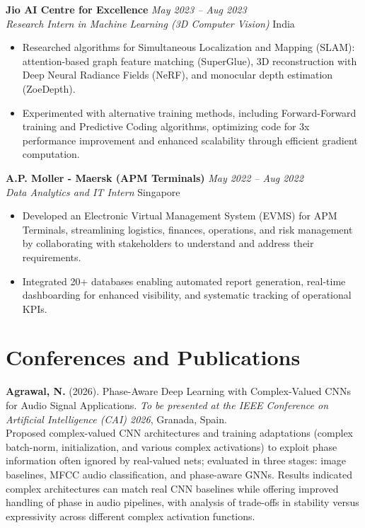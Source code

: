 \documentclass[10pt,a4paper]{article}
\newcommand{\cventry}[4]{%
\textbf{#1} \hfill \textit{#2} \\
\textit{#3} \hfill #4
\vspace{2pt}
}
\begin{document}
\vspace{4pt}

\cventry{Jio AI Centre for Excellence}{May 2023 -- Aug 2023}{Research Intern in Machine Learning (3D Computer Vision)}{India}
\begin{itemize}
    \item Researched algorithms for Simultaneous Localization and Mapping (SLAM): attention-based graph feature matching (SuperGlue), 3D reconstruction with Deep Neural Radiance Fields (NeRF), and monocular depth estimation (ZoeDepth).
    \item Experimented with alternative training methods, including Forward-Forward training and Predictive Coding algorithms, optimizing code for 3x performance improvement and enhanced scalability through efficient gradient computation.
\end{itemize}

\vspace{4pt}

\cventry{A.P. Moller - Maersk (APM Terminals)}{May 2022 -- Aug 2022}{Data Analytics and IT Intern}{Singapore}
\begin{itemize}
    \item Developed an Electronic Virtual Management System (EVMS) for APM Terminals, streamlining logistics, finances, operations, and risk management by collaborating with stakeholders to understand and address their requirements.
    \item Integrated 20+ databases enabling automated report generation, real-time dashboarding for enhanced visibility, and systematic tracking of operational KPIs.
\end{itemize}

\section{Conferences and Publications}

\textbf{Agrawal, N.} (2026). Phase-Aware Deep Learning with Complex-Valued CNNs for Audio Signal Applications. \textit{To be presented at the IEEE Conference on Artificial Intelligence (CAI) 2026}, Granada, Spain.\\
{\small Proposed complex-valued CNN architectures and training adaptations (complex batch-norm, initialization, and various complex activations) to exploit phase information often ignored by real-valued nets; evaluated in three stages: image baselines, MFCC audio classification, and phase-aware GNNs. Results indicated complex architectures can match real CNN baselines while offering improved handling of phase in audio pipelines, with analysis of trade-offs in stability versus expressivity across different complex activation functions.}
\end{document}

